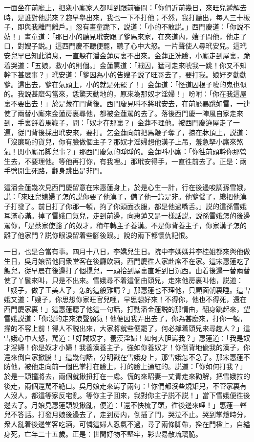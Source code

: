 一面坐在前廳上，把衆小廝家人都叫到跟前審問：「你們近前幾日，來旺兒遞解去時，是誰對他説來？趂早擧出來，我也一下不打他；不然，我打聽出，每人三十板子，即與我離門離戶。」忽有畫童跪下，説道：「小的不敢説。」西門慶道：「你説不妨！」畫童道：「那日小的聽見玳安跟了爹馬來家，在夾道内，嫂子問他，他走了口，對嫂子説。」這西門慶不聽便罷，聽了心中大怒。一片聲使人尋玳安兒。這玳安兒早已知此消息，一直躱在潘金蓮房裏不出來。金蓮正洗臉，小廝走到屋裏，跪着哭道：「五娘，救小的則個。」金蓮罵道：「賊囚，猛可走來唬我一跳！你又不知幹下甚麽事？」玳安道：「爹因為小的告嫂子説了旺哥去了，要打我。娘好歹勸勸爹。這出去，爹在氣頭上，小的就是死罷了！」金蓮道：「怪道囚根子唬的鬼也似的。我説甚麽勾當來，恁驚天動地的，原來為那奴才淫婦！」吩咐：「你在我這屋裏不要出去！」於是藏在門背後。西門慶見呌不將玳安去，在前廳暴跳如雷，一連使了兩替小廝來金蓮房裏尋他，都被金蓮駡的去了。落後西門慶一陣風自家走來到，手裏㧱着馬鞭子，問：「奴才在那裏？」金蓮不理他。被西門慶遶屋走了一遍，従門背後採出玳安來，要打。乞金蓮向前把馬鞭子奪了，掠在牀頂上，説道：「沒廉恥的貨兒，你有臉做個主子？那奴才淫婦想他漢子上吊，羞急拏小廝來煞氣！関小廝吊脚兒事？」那西門慶氣的睜睜的。金蓮呌小廝：「你徃前頭幹你那營生去，不要理他。等他再打你，有我哩。」那玳安得手，一直徃前去了。正是：兩手劈開生死路，翻身跳出是非門。

這潘金蓮幾次見西門慶留意在宋惠蓮身上，於是心生一計，行在後邊唆調孫雪娥，説：「來旺兒媳婦子怎的説你要了他漢子，備了他一篇是非。他爹惱了，纔把他漢子打發了。前日打了你那一頓，拘了你頭面衣服，都是他過嘴舌。」説的這孫雪娥耳滿心滿。掉了雪娥口氣兒，走到前邊，向惠蓮又是一樣話説，説孫雪娥怎的後邊駡你，「是蔡家使豁了的奴才，積年轉主子養漢。不是你背養主子，你家漢子怎的離了他家門？説你眼淚留着些腳後跟。」說的兩下都懷仇記恨。

一日，也是合當有事。四月十八日，李嬌兒生日。院中李媽媽并李桂姐都來與他做生日，吳月娘留他同衆堂客在後廳飲酒，西門慶徃人家赴席不在家。這宋惠蓮吃了飯兒，従早晨在後邊打了個㨪兒，一頭拾到屋裏直睡到日沉西。由着後邊一替兩替使了丫鬟來叫，只是不出來。雪娥尋不着這個由頭兒，走來他房裏叫他，説道：「嫂子，做了王美人了，怎的這般難請？」那惠蓮也不理他，只顧面朝裏睡。這雪娥又道：「嫂子，你思想你家旺官兒哩，早思想好來！不得你，他也不得死，還在西門慶家裏！」這惠蓮聽了他這一句話，打動潘金蓮説的那情由，翻身跳起來，望雪娥説道：「你沒的走來浪聲顙氣！他便因我弄出去了，你為甚麽來，打你一頓，攆的不容上前！得人不説出來，大家將就些便罷了，何必撑着頭兒來尋趂人？」這雪娥心中大怒，駡道：「好賊奴才，養漢淫婦！如何大胆罵我？」惠蓮道：「我是奴才淫婦！你是奴才小婦！我養漢養主子，強如你養奴才！你倒背地偸我的漢子，你還來倒自家掀騰！」這幾句話，分明戳在雪娥身上，那雪娥怎不急了。那宋惠蓮不防他，被他走向前一個巴掌打在臉上，打的臉上通紅的。説道：「你如何打我？」於是一頭撞將去，兩個就揪扭打在一䖏。慌的來昭妻一丈青走來勸解，把雪娥拉的後走，兩個還駡不絶口。吳月娘走來罵了兩句：「你們都沒些規矩兒，不管家裏有人沒人，都這等家反宅亂。等你主子囬來，我對你主子説不説！」當下雪娥便徃後邊去了。月娘見惠蓮頭髮揪亂，便道：「還不快梳了頭，徃後邊來哩！」惠蓮一聲兒不答話。打發月娘後邊去了，走到房内，倒插了門，哭泣不止。哭到掌燈時分，衆人亂着後邊堂客吃酒，可憐這婦人忍氣不過，尋了兩條脚帶，拴在門楹上，自縊身死，亡年二十五歲。正是：世間好物不堅牢，彩雲易散琉璃脆。

